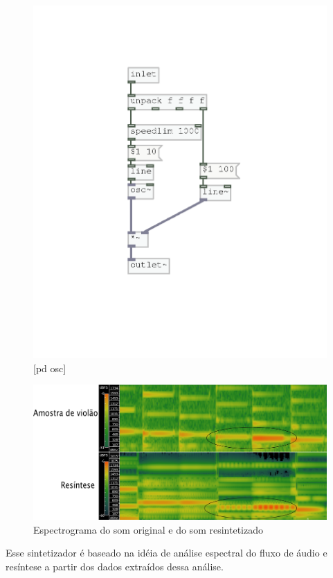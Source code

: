 \documentclass[draft]{ppgmus}
\begin{document}
\begin{figure}
\includegraphics[scale=.7]{osc-base}
\caption{[pd osc]}
\label{pdosc}
\end{figure}

\begin{figure}
\includegraphics[scale=.7]{spectro}
\caption{Espectrograma do som original e do som resintetizado}
\label{spectro}
\end{figure}


Esse sintetizador é baseado na idéia de análise espectral do fluxo
de áudio e resíntese a partir dos dados extraídos dessa análise.
\end{document}
